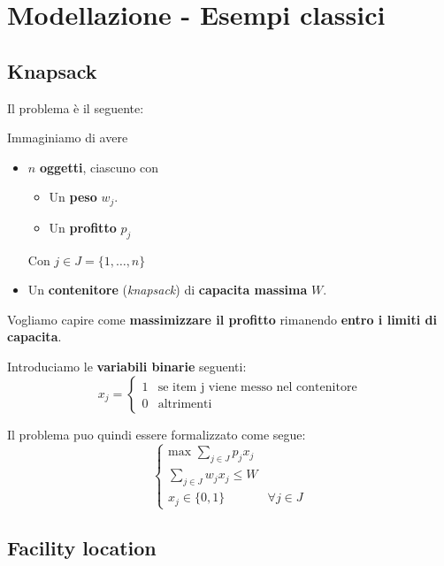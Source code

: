 \chapter{Modellazione - Esempi classici}

\section{Knapsack}

Il problema è il seguente:

\begin{exa}[KNAPSACK]
    Immaginiamo di avere
    \begin{itemize}
        \item $n$ \textbf{oggetti}, ciascuno con
            \begin{itemize}
                \item Un \textbf{peso} $w_j$.
                \item Un \textbf{profitto} $p_j$
            \end{itemize}
            Con $j\in J = \{ 1,\ldots ,n \}  $
        \item Un \textbf{contenitore} (\textit{knapsack}) 
            di \textbf{capacita massima} $W$.
    \end{itemize}
    Vogliamo capire come \textbf{massimizzare il profitto} 
    rimanendo \textbf{entro i limiti di capacita}.
\end{exa}

Introduciamo le \textbf{variabili binarie} seguenti:
\[
    x_j = \begin{cases}
        1 & \text{se item j viene messo nel contenitore} \\ 
        0 & \text{altrimenti}
    \end{cases}
\]

Il problema puo quindi essere formalizzato come segue:
\[
    \begin{cases}
        \text{max } \displaystyle\sum_{j \in J} p_{j} x_{j} \\ 
        \sum_{j\in J} w_{j} x_{j} \le W \\ 
        x_{j} \in \{0,1\} & \forall j \in J
    \end{cases}
\]

\section{Facility location}

